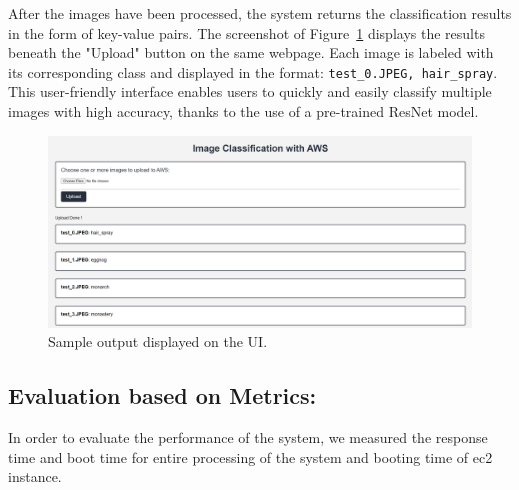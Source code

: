 \documentclass[../main.tex]{subfiles}
\begin{document}
After the images have been processed, the system returns the classification results in the form of key-value pairs. The screenshot of Figure~\ref{fig:op} displays the results beneath the "Upload" button on the same webpage. Each image is labeled with its corresponding class and displayed in the format: \verb|test_0.JPEG, hair_spray|. This user-friendly interface enables users to quickly and easily classify multiple images with high accuracy, thanks to the use of a pre-trained ResNet model.
\begin{figure}[h!]
\centering
\includegraphics[scale=0.36]{images/output.png}
\caption{Sample output displayed on the UI.}
\label{fig:op}
\end{figure}

\subsection*{Evaluation based on Metrics:}
In order to evaluate the performance of the system, we measured the response time and boot time for entire processing of the system and booting time of ec2 instance. 
\newpage
\end{document}
